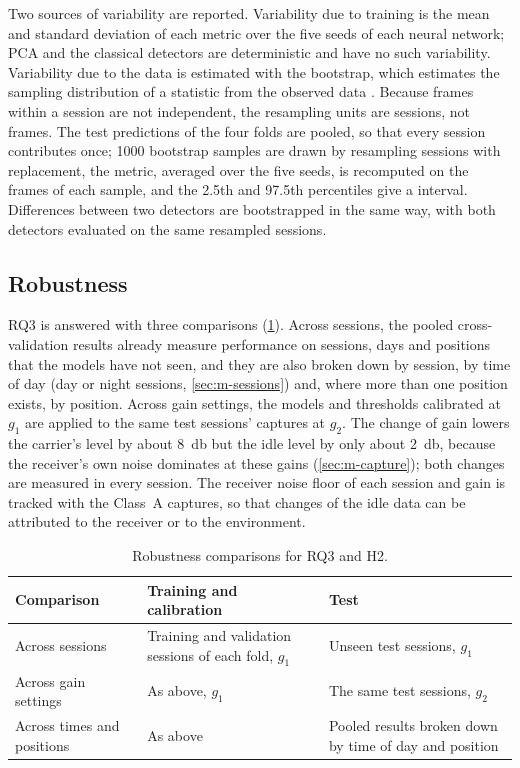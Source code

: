 Two sources of variability are reported. Variability due to training is the mean and standard deviation of each metric over the five seeds of each neural network; PCA and the classical detectors are deterministic and have no such variability. Variability due to the data is estimated with the bootstrap, which estimates the sampling distribution of a statistic from the observed data \parencite{efron1979}. Because frames within a session are not independent, the resampling units are sessions, not frames. The test predictions of the four folds are pooled, so that every session contributes once; \num{1000} bootstrap samples are drawn by resampling sessions with replacement, the metric, averaged over the five seeds, is recomputed on the frames of each sample, and the 2.5th and 97.5th percentiles give a  interval. Differences between two detectors are bootstrapped in the same way, with both detectors evaluated on the same resampled sessions.

\subsection{Robustness}
\label{sec:m-robustness}

RQ3 is answered with three comparisons (\cref{tab:m-robustness}). Across sessions, the pooled cross-validation results already measure performance on sessions, days and positions that the models have not seen, and they are also broken down by session, by time of day (day or night sessions, \cref{sec:m-sessions}) and, where more than one position exists, by position. Across gain settings, the models and thresholds calibrated at $g_1$ are applied to the same test sessions' captures at $g_2$. The change of gain lowers the carrier's level by about \qty{8}{\decibel} but the idle level by only about \qty{2}{\decibel}, because the receiver's own noise dominates at these gains (\cref{sec:m-capture}); both changes are measured in every session. The receiver noise floor of each session and gain is tracked with the Class~A captures, so that changes of the idle data can be attributed to the receiver or to the environment.

\begin{table}[tbp]
  \centering
  \caption[Robustness comparisons]{Robustness comparisons for RQ3 and H2.}
  \label{tab:m-robustness}
  \begin{tabularx}{\textwidth}{@{} >{\raggedright\arraybackslash}p{3.0cm} >{\raggedright\arraybackslash}X >{\raggedright\arraybackslash}X @{}}
    \toprule
    Comparison & Training and calibration & Test \\
    \midrule
    Across sessions & Training and validation sessions of each fold, $g_1$ & Unseen test sessions, $g_1$ \\
    Across gain settings & As above, $g_1$ & The same test sessions, $g_2$ \\
    Across times and positions & As above & Pooled results broken down by time of day and position \\
    \bottomrule
  \end{tabularx}
\end{table}

